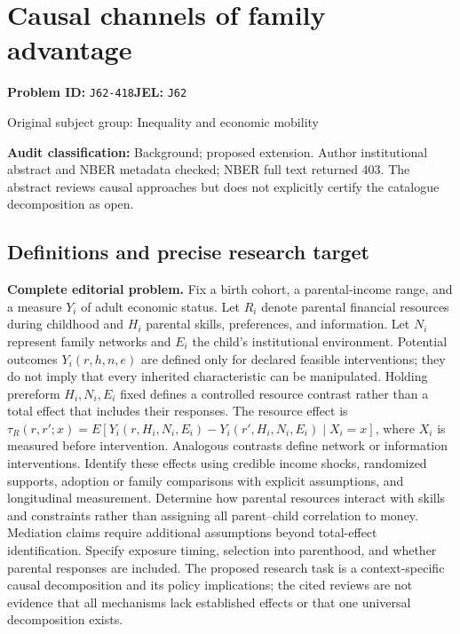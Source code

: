 \documentclass[11pt,a4paper]{article}
\begin{document}
\section*{Causal channels of family advantage}
\textbf{Problem ID:} \texttt{J62-418}\quad \textbf{JEL:} \texttt{J62}\par
\label{problem:OP-0363}
{\sffamily\small\color{muted}Original subject group: Inequality and economic mobility\par}
\label{definitions:problem:30007645}
\textbf{Audit classification:} Background; proposed extension. Author institutional abstract and NBER metadata checked; NBER full text returned 403. The abstract reviews causal approaches but does not explicitly certify the catalogue decomposition as open.
\subsection*{Definitions and precise research target}
\textbf{Complete editorial problem.} Fix a birth cohort, a parental-income range, and a measure \(Y_i\) of adult economic status. Let \(R_i\) denote parental financial resources during childhood and \(H_i\) parental skills, preferences, and information. Let \(N_i\) represent family networks and \(E_i\) the child's institutional environment. Potential outcomes \(Y_i(r,h,n,e)\) are defined only for declared feasible interventions; they do not imply that every inherited characteristic can be manipulated. Holding prereform \(H_i,N_i,E_i\) fixed defines a controlled resource contrast rather than a total effect that includes their responses. The resource effect is \(\tau_R(r,r';x)=E[Y_i(r,H_i,N_i,E_i)-Y_i(r',H_i,N_i,E_i)\mid X_i=x]\), where \(X_i\) is measured before intervention. Analogous contrasts define network or information interventions. Identify these effects using credible income shocks, randomized supports, adoption or family comparisons with explicit assumptions, and longitudinal measurement. Determine how parental resources interact with skills and constraints rather than assigning all parent--child correlation to money. Mediation claims require additional assumptions beyond total-effect identification. Specify exposure timing, selection into parenthood, and whether parental responses are included. The proposed research task is a context-specific causal decomposition and its policy implications; the cited reviews are not evidence that all mechanisms lack established effects or that one universal decomposition exists.
\end{document}
